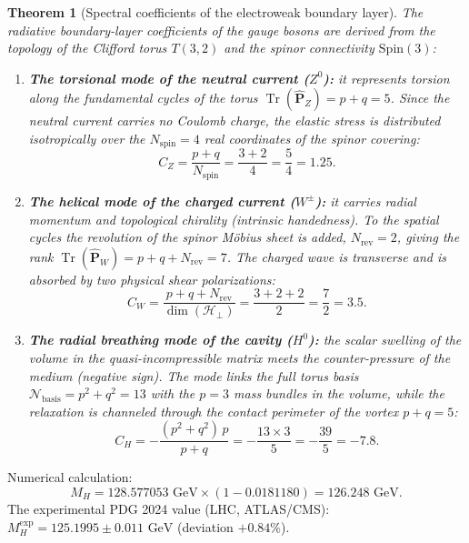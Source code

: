 \documentclass[11pt,a4paper]{article}
\newtheorem{theorem}{Theorem}
\theoremstyle{definition}
\theoremstyle{remark}
\begin{document}
\begin{theorem}[Spectral coefficients of the electroweak boundary layer]
\label{thm:electroweak_boundary_coefficients_exact}
The radiative boundary-layer coefficients of the gauge bosons are derived from the topology of the Clifford torus $T(3,2)$ and the spinor connectivity $\mathrm{Spin}(3)$:
\begin{enumerate}
\item \textbf{The torsional mode of the neutral current ($Z^0$):} it represents torsion along the fundamental cycles of the torus $\operatorname{Tr}(\hat{\mathbf{P}}_Z) = p + q = 5$. Since the neutral current carries no Coulomb charge, the elastic stress is distributed isotropically over the $N_{\mathrm{spin}} = 4$ real coordinates of the spinor covering:
\begin{equation}
C_Z = \frac{p + q}{N_{\mathrm{spin}}} = \frac{3 + 2}{4} = \frac{5}{4} = 1.25.
\label{eq:C_Z_exact_derived}
\end{equation}
\item \textbf{The helical mode of the charged current ($W^\pm$):} it carries radial momentum and topological chirality (intrinsic handedness). To the spatial cycles the revolution of the spinor Möbius sheet is added, $N_{\mathrm{rev}} = 2$, giving the rank $\operatorname{Tr}(\hat{\mathbf{P}}_W) = p + q + N_{\mathrm{rev}} = 7$. The charged wave is transverse and is absorbed by two physical shear polarizations:
\begin{equation}
C_W = \frac{p + q + N_{\mathrm{rev}}}{\dim(\mathcal{H}_\perp)} = \frac{3 + 2 + 2}{2} = \frac{7}{2} = 3.5.
\label{eq:C_W_exact_derived}
\end{equation}

\item \textbf{The radial breathing mode of the cavity ($H^0$):} the scalar swelling of the volume in the quasi-incompressible matrix meets the counter-pressure of the medium (negative sign). The mode links the full torus basis $\mathcal{N}_{\mathrm{basis}} = p^2 + q^2 = 13$ with the $p=3$ mass bundles in the volume, while the relaxation is channeled through the contact perimeter of the vortex $p+q = 5$:
\begin{equation}
C_H = -\frac{(p^2 + q^2) \, p}{p + q} = -\frac{13 \times 3}{5} = -\frac{39}{5} = -7.8.
\label{eq:C_H_exact_derived}
\end{equation}
\end{enumerate}
\end{theorem}
Numerical calculation:
\begin{equation}
	M_H = 128.577053\text{ GeV} \times (1 - 0.0181180) = 126.248\text{ GeV}.
\label{eq:higgs_mass_val_numerical}
\end{equation}
The experimental PDG 2024 value (LHC, ATLAS/CMS): $M_H^{\mathrm{exp}} = 125.1995 \pm 0.011\text{ GeV}$ (deviation $+0.84\%$).
\end{document}
